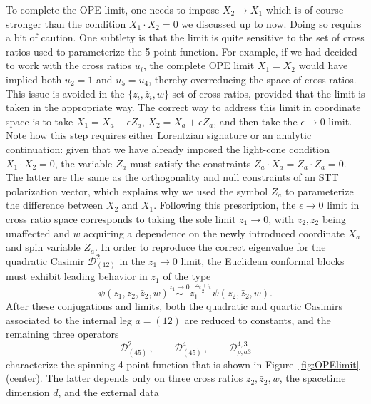 \documentclass{article}
\begin{document}
To complete the OPE limit, one needs to impose $X_2\rightarrow X_1$ which is of course 
stronger than the condition $X_1\cdot X_2=0$ we discussed up to now. Doing so requirs a bit of caution. One subtlety is that the limit is quite sensitive to the set 
of cross ratios used to parameterize the 5-point function. For example, if we 
had decided to work with the cross ratios $u_i$, the complete OPE limit $X_1=X_2$ would 
have implied both $u_2=1$ and $u_5=u_4$, thereby overreducing the space of cross ratios. This issue is avoided in the $\{z_i, \bar{z}_i,w\}$ set of cross ratios, provided that the limit is taken in the appropriate way.
The correct way to address this limit in coordinate space is to take $X_1=X_a-\epsilon Z_a$, $X_2=X_a+\epsilon 
Z_a$, and then take the $\epsilon\rightarrow 0$ limit. Note how this step requires either 
Lorentzian signature or an analytic continuation: given that we have already imposed the light-cone 
condition $X_1\cdot X_2=0$, the variable $Z_a$ must satisfy the constraints $Z_a\cdot X_a=Z_a\cdot Z_a=0$. The latter are the same as the orthogonality and null constraints of an STT polarization vector, which explains why we used the symbol $Z_a$ to parameterize the difference between $X_2$ and
$X_1$. Following this prescription, the $\epsilon\rightarrow 0$ limit 
in cross ratio space corresponds to taking the sole limit $z_1\rightarrow 0$, with $z_2, 
\bar{z}_2$ being unaffected and $w$ acquiring a dependence on the newly introduced coordinate $X_a$ and spin 
variable $Z_a$. In order to reproduce the correct eigenvalue for the quadratic Casimir
$\mathcal{D}_{(12)}^2$ in the $z_1\rightarrow 0$ limit, the Euclidean conformal blocks must exhibit leading behavior in $z_1$ of the type
\begin{equation}
     \psi(z_1,z_2,\bar{z}_2,w)\stackrel{z_1\rightarrow 0}{\sim} 
     z_1^{\frac{\Delta_a+l_a}{2}} \psi(z_2,\bar{z}_2,w).
\end{equation}
After these conjugations and limits, both the quadratic and quartic Casimirs associated 
to the internal leg $a=(12)$ are reduced to constants, and the remaining three operators
\begin{equation}
    \mathcal{D}_{(45)}^2\,, \qquad     \mathcal{D}_{(45)}^4 \,, 
    \qquad \mathcal{D}_{\rho,a3}^{4,3}
\label{fourpoint_operators}
\end{equation}
characterize the spinning 4-point function that is shown in  Figure~\ref{fig:OPElimit} 
(center). The latter depends only on three cross ratios $z_2,\bar{z}_2,w$, the spacetime 
dimension $d$, and the external data
\end{document}
